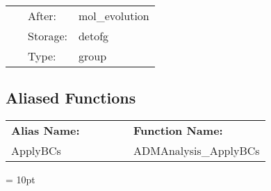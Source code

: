 \documentclass{article}
\begin{document}
 \begin{tabular*}{160mm}{cll} 
~ & After:  & mol\_evolution \\ 
~ & Storage:  & detofg \\ 
~ & Type:  & group \\ 
\end{tabular*} 


\subsection*{Aliased Functions}

\hspace{5mm}

 \begin{tabular*}{160mm}{ll} 

{\bf Alias Name:} ~~~~~~~ & {\bf Function Name:} \\ 
ApplyBCs & ADMAnalysis\_ApplyBCs \\ 
\end{tabular*} 



\vspace{5mm}\parskip = 10pt 
\end{document}
